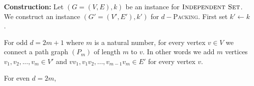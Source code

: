 \documentclass[10pt, a4paper]{article}
\theoremstyle{definition}
\begin{document}
\textbf{Construction:} Let $(G = (V,E) ,k)$ be an instance for $\textsc{Independent Set}$. We construct an instance $(G' = (V',E'),k')$ for $d-$\textsc{Packing}. First set $k' \leftarrow k$. 

For odd $d = 2m+1$ where $m$ is a natural number, for every vertex $v \in V$ we connect a path graph $(P_m)$ of length $m$ to $v$. In other words we add $m$ vertices $v_1, v_2, ..., v_m \in V'$ and $vv_1, v_1v_2,...,v_{m-1}v_m \in E'$ for every vertex $v$.


For even $d = 2m$,

\end{document}
